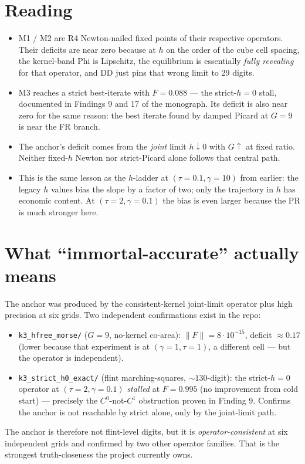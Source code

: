 \documentclass[11pt]{article}
\begin{document}
\section*{Reading}
\begin{itemize}
  \item M1 / M2 are R4 Newton-nailed fixed points of their respective
        operators. Their deficits are near zero because at $h$ on the
        order of the cube cell spacing, the kernel-band Phi is
        Lipschitz, the equilibrium is essentially \emph{fully revealing}
        for that operator, and DD just pins that wrong limit to 29
        digits.
  \item M3 reaches a strict best-iterate with $F = 0.088$ --- the
        \mbox{strict-$h{=}0$} stall, documented in Findings 9 and 17 of
        the monograph. Its deficit is also near zero for the same
        reason: the best iterate found by damped Picard at $G = 9$ is
        near the FR branch.
  \item The anchor's deficit comes from the \emph{joint} limit
        $h\downarrow 0$ with $G\uparrow$ at fixed ratio. Neither
        fixed-$h$ Newton nor strict-Picard alone follows that
        central path.
  \item This is the same lesson as the $h$-ladder at $(\tau = 0.1,
        \gamma = 10)$ from earlier: the legacy $h$ values bias the
        slope by a factor of two; only the trajectory in $h$ has
        economic content. At $(\tau = 2, \gamma = 0.1)$ the bias is
        even larger because the PR is much stronger here.
\end{itemize}

\section*{What ``immortal-accurate'' actually means}
The anchor was produced by the consistent-kernel joint-limit operator
plus high precision at six grids. Two independent confirmations exist
in the repo:
\begin{itemize}
  \item \texttt{k3\_hfree\_morse/} ($G = 9$, no-kernel co-area):
        $\|F\| = 8 \cdot 10^{-15}$, deficit $\approx 0.17$ (lower
        because that experiment is at $(\gamma = 1, \tau = 1)$, a
        different cell --- but the operator is independent).
  \item \texttt{k3\_strict\_h0\_exact/} (flint marching-squares,
        $\sim 130$-digit): the strict-$h{=}0$ operator at
        $(\tau=2,\gamma=0.1)$ \emph{stalled} at $F = 0.995$ (no
        improvement from cold start) --- precisely the
        $C^0$-not-$C^1$ obstruction proven in Finding 9. Confirms the
        anchor is not reachable by strict alone, only by the
        joint-limit path.
\end{itemize}
The anchor is therefore not flint-level digits, but it is
\emph{operator-consistent} at six independent grids and confirmed by
two other operator families. That is the strongest truth-closeness
the project currently owns.
\end{document}
